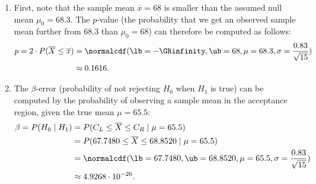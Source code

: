 {\begin{enumerate}[label=(\alph*)]
        \item First, note that the sample mean $\overline{x} = 68$ is smaller than the assumed null mean $\mu_0 = 68.3$.
        The $p$-value (the probability that we get an observed sample mean further from $68.3$ than $\mu_0=68$) can therefore be computed as follows:
        \begin{align*}
            p = 2 \cdot P(\overline{X} \leq \overline{x})   &= \normalcdf(\lb=-\GRinfinity, \ub=68, \mu=68.3, \sigma=\frac{0.83}{\sqrt{15}}) \\
                                                            &\approx 0.1616.
        \end{align*}
        \item The $\beta$-error (probability of not rejecting $H_0$ when $H_1$ is true) can be computed by the probability of observing a sample mean in the acceptance region,
        given the true mean $\mu = 65.5$:
        \begin{align*}
            \beta = P(H_0 \mid H_1)    &= P(C_L \leq \overline{X} \leq C_R \mid \mu=65.5) \\
                                    &= P(67.7480 \leq \overline{X} \leq 68.8520 \mid \mu=65.5) \\
                                    &= \normalcdf(\lb=67.7480, \ub=68.8520, \mu=65.5, \sigma=\frac{0.83}{\sqrt{15}}) \\
                                    &\approx 4.9268 \cdot 10^{-26}.
        \end{align*}
    \end{enumerate}
}

